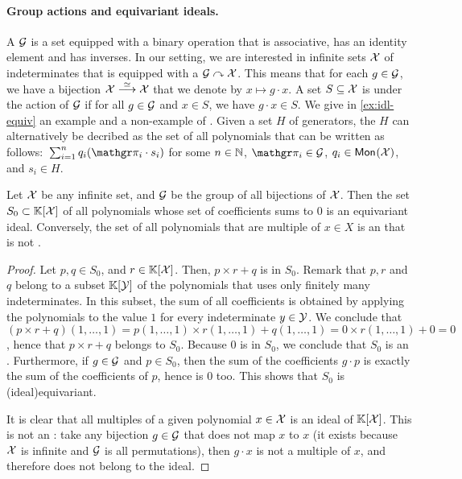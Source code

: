 \paragraph{Group actions and equivariant ideals.}  A 
$\mathcal{G}$ is a set equipped with a binary operation that is associative, has an
identity element and has inverses. In our setting, we are interested in
infinite sets $\mathcal{X}$ of indeterminates that is equipped with a  $\mathcal{G} \curvearrowright \mathcal{X}$. This means that for each $g \in \mathcal{G}$,
we have a bijection $\mathcal{X} \stackrel{\simeq}{\longrightarrow} \mathcal{X}$ that we denote by $x \mapsto g \cdot x$. A
set $S \subseteq \mathcal{X}$ is  under the action of $\mathcal{G}$ if for
all $g \in \mathcal{G}$ and $x \in S$, we have $g \cdot x \in S$.
We give in \cref{ex:idl-equiv} an example and a
non-example of  .
Given a set $H$ of generators,
the  $H$
can alternatively be decribed
as 
 the set of all polynomials that can be written as
follows: $\,\sum_{i=1}^n q_i (\gelem_i \cdot s_i)$ for some $n \in \mathbb{N}$, $\gelem_i
\in \group$, $q_i \in \mathsf{Mon}_{}(\mathcal{X})$, and $s_i \in H$.


\begin{example}
    \label{ex:idl-equiv}
    Let $\mathcal{X}$ be any infinite set, and $\mathcal{G}$ be the 
    group of all bijections of $\mathcal{X}$. 
    Then the set $S_0 \subset \mathbb{K}[\mathcal{X}]$ of all polynomials 
    whose set of coefficients sums to $0$ is an equivariant ideal.
    Conversely, the set of all polynomials that are multiple
    of $x \in X$ is an  that is not .
\end{example}
\begin{proof}
    Let $p,q\in S_0$, and $r \in \mathbb{K}[\mathcal{X}]$.
    Then, $p \times r + q$ is in $S_0$. Remark that 
    $p,r$ and $q$ belong to a subset $\mathbb{K}[\mathcal{Y}]$ of the 
    polynomials that uses only finitely many indeterminates.
    In this subset, the sum of all coefficients is obtained
    by applying the polynomials to the value $1$ for every indeterminate
    $y \in \mathcal{Y}$. We conclude that
    $(p \times r + q)(1,\dots, 1) 
    = p(1,\dots,1) \times r(1,\dots,1) + q(1,\dots,1)
    = 0 \times r(1, \dots, 1) + 0 = 0$, hence that
    $p \times r + q$ belongs to $S_0$. 
    Because $0$ is in $S_0$, we conclude that $S_0$ is an .
    Furthermore, if $g \in \mathcal{G}$ and $p \in S_0$, then
    the sum of the coefficients $g \cdot p$ is exactly
    the sum of the coefficients of $p$, hence is $0$ too.
    This shows that $S_0$ is \kl(ideal){equivariant}.

    It is clear that all multiples of a given polynomial $x \in \mathcal{X}$
    is an ideal of $\mathbb{K}[\mathcal{X}]$. This is not an :
    take any bijection $g \in \mathcal{G}$ that does not map $x$ to $x$ (it
    exists because $\mathcal{X}$ is infinite and $\mathcal{G}$ is all permutations),
    then $g \cdot x$ is not a multiple of $x$, and therefore does 
    not belong to the ideal.
\end{proof}

